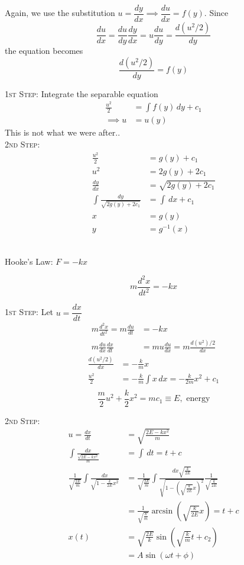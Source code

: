\documentclass[10pt]{scrartcl}
\begin{document}

Again, we use the substitution $u = \dfrac{dy}{dx}\implies \dfrac{du}{dx} = f(y)$. Since \[\dfrac{du}{dx} = \dfrac{du}{dy}\dfrac{dy}{dx}
  = u\dfrac{du}{dy}
  =\dfrac{d(u^2/2)}{dy}\]the equation becomes \[\dfrac{d(u^2/2)}{dy} = f(y)\]

\textsc{1st Step:} Integrate the separable equation\[
\begin{aligned}
  \frac{u^2}{2} &= \int f(y)\,dy + c_1\\
  \implies u &= u(y)
\end{aligned}
\]
This is not what we were after..\\

\textsc{2nd Step:}
\[
\begin{aligned}
  \frac{u^2}{2} &= g(y) + c_1\\
  u^2 &= 2g(y) + 2c_1\\
  \frac{dy}{dx} &= \sqrt{2g(y) + 2c_1}\\
  \int \frac{dy}{\sqrt{2g(y)+2c_1}} &= \int \,dx + c_1\\
  x &= g(y)\\
  y &= g^{-1}(x)
\end{aligned}
\]~\\

\begin{example}
	Hooke's Law: $F = -kx$
	
	\[m\frac{d^2x}{dt^2} = -kx\]
	
\textsc{1st Step:}
Let $u = \dfrac{dx}{dt}$
\[
\begin{aligned}
  m\frac{d^2x}{dt^2} = m\frac{du}{dt} &= -kx\\
  m\frac{du}{dx}\frac{dx}{dt} &= mu\frac{du}{dx} = m\frac{d(u^2)/2}{dx}
\end{aligned}
\]
\[
\begin{aligned}
  \frac{d(u^2/2)}{dx} &= -\frac{k}{m}x\\
  \frac{u^2}{2} &= -\frac{k}{m}\int x\,dx = -\frac{k}{2m}x^2 + c_1\\
\end{aligned}
\]
\[\frac{m}{2}u^2 + \frac{k}{2}x^2 = mc_1 \equiv E, \text{ energy}\]

\textsc{2nd Step:}
\[
\begin{aligned}
  u = \frac{dx}{dt} &= \sqrt{\frac{2E -kx^2}{m}}\\
  \int \frac{dx}{\frac{\sqrt{2E-kx^2}}{m}} &= \int \,dt = t +c\\
  \frac{1}{\sqrt{\frac{2E}{m}}}\int \frac{dx}{\sqrt{1-\frac{k}{2E}x^2}} &=  \frac{1}{\sqrt{\frac{2E}{m}}} \int \frac{dx\sqrt{\frac{k}{2E}}}{\sqrt{1-\left(\sqrt{\frac{k}{2E}}x\right)^2}}\frac{1}{\sqrt{\frac{k}{2E}}}\\
  &= \frac{1}{\sqrt{\frac{k}{m}}}\arcsin\left(\sqrt{\frac{k}{2E}}x\right) = t+c\\
  x(t) &= \sqrt{\frac{2E}{k}}\sin\left(\sqrt{\frac{k}{m}}t + c_2\right)\\
  &= A\sin(\omega t + \phi)
\end{aligned}
\]
\end{example}
\end{document}
